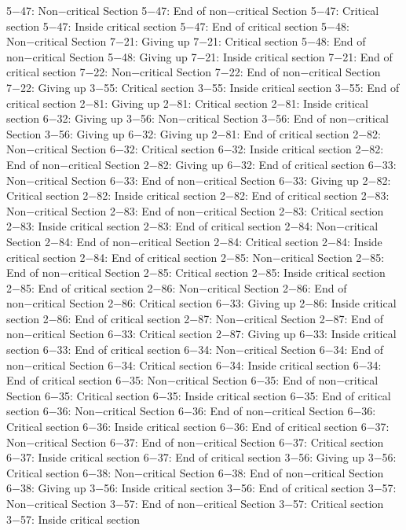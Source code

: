 5−47: Non−critical Section
5−47: End of non−critical Section
5−47: Critical section
5−47: Inside critical section
5−47: End of critical section
5−48: Non−critical Section
7−21: Giving up
7−21: Critical section
5−48: End of non−critical Section
5−48: Giving up
7−21: Inside critical section
7−21: End of critical section
7−22: Non−critical Section
7−22: End of non−critical Section
7−22: Giving up
3−55: Critical section
3−55: Inside critical section
3−55: End of critical section
2−81: Giving up
2−81: Critical section
2−81: Inside critical section
6−32: Giving up
3−56: Non−critical Section
3−56: End of non−critical Section
3−56: Giving up
6−32: Giving up
2−81: End of critical section
2−82: Non−critical Section
6−32: Critical section
6−32: Inside critical section
2−82: End of non−critical Section
2−82: Giving up
6−32: End of critical section
6−33: Non−critical Section
6−33: End of non−critical Section
6−33: Giving up
2−82: Critical section
2−82: Inside critical section
2−82: End of critical section
2−83: Non−critical Section
2−83: End of non−critical Section
2−83: Critical section
2−83: Inside critical section
2−83: End of critical section
2−84: Non−critical Section
2−84: End of non−critical Section
2−84: Critical section
2−84: Inside critical section
2−84: End of critical section
2−85: Non−critical Section
2−85: End of non−critical Section
2−85: Critical section
2−85: Inside critical section
2−85: End of critical section
2−86: Non−critical Section
2−86: End of non−critical Section
2−86: Critical section
6−33: Giving up
2−86: Inside critical section
2−86: End of critical section
2−87: Non−critical Section
2−87: End of non−critical Section
6−33: Critical section
2−87: Giving up
6−33: Inside critical section
6−33: End of critical section
6−34: Non−critical Section
6−34: End of non−critical Section
6−34: Critical section
6−34: Inside critical section
6−34: End of critical section
6−35: Non−critical Section
6−35: End of non−critical Section
6−35: Critical section
6−35: Inside critical section
6−35: End of critical section
6−36: Non−critical Section
6−36: End of non−critical Section
6−36: Critical section
6−36: Inside critical section
6−36: End of critical section
6−37: Non−critical Section
6−37: End of non−critical Section
6−37: Critical section
6−37: Inside critical section
6−37: End of critical section
3−56: Giving up
3−56: Critical section
6−38: Non−critical Section
6−38: End of non−critical Section
6−38: Giving up
3−56: Inside critical section
3−56: End of critical section
3−57: Non−critical Section
3−57: End of non−critical Section
3−57: Critical section
3−57: Inside critical section
